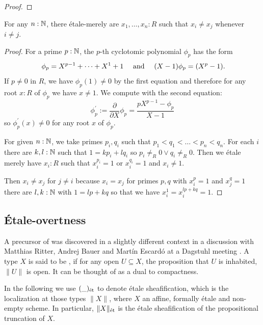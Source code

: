 \begin{proof}
\end{proof}

\begin{proposition}
  For any \(n:\N\), there étale-merely are \(x_1,\dots,x_n:R\) such that \(x_i\neq x_j\) whenever \(i\neq j\).
\end{proposition}

\begin{proof}
  For a prime \(p:\N\), the \(p\)-th cyclotomic polynomial \(\phi_p\) has the form
  \[
    \phi_p=X^{p-1}+\dots+X^1+1 \quad \text{ and } \quad (X-1)\phi_p=(X^p-1) \rlap{.}
  \]
  If \(p\neq 0\) in \(R\), we have \(\phi_p(1)\neq 0\) by the first equation
  and therefore for any root \(x:R\) of \(\phi_p\) we have \(x\neq 1\).
  We compute with the second equation:
  \[
    \phi_p^\prime:=\frac{\partial}{\partial X}\phi_p = \frac{pX^{p-1}-\phi_p}{X-1}
  \]
  so \(\phi_p^\prime(x)\neq 0\) for any root \(x\) of \(\phi_p\).

  For given \(n:\N\), we take primes \(p_i,q_i\) such that \(p_1<q_1<\dots <p_n < q_n\).
  For each \(i\) there are \(k,l:\N\) such that \(1=kp_i+lq_i\) so \(p_i\neq_R 0\vee q_i\neq_R 0\).
  Then we étale merely have \(x_i:R\) such that \(x_i^{p_i}=1\) or \(x_i^{q_i}=1\) and \(x_i\neq 1\).

  Then \(x_i\neq x_j\) for \(j\neq i\) because \(x_i=x_j\)
  for primes \(p,q\) with \(x_i^p=1\) and \(x_j^q=1\) there are \(l,k:\N\) with \(1=lp+kq\) so that we have \(x_i^1=x_i^{lp+kq}=1\).
\end{proof}

\subsection{Étale-overtness}

A precursor of  was discovered in a slightly different context in a discussion with Matthias Ritter, Andrej Bauer and Martín Escardó at a Dagstuhl meeting \cite{Dagstuhl-reference}.
A type \(X\) is said to be , if for any open \(U\subseteq X\), the proposition that \(U\) is inhabited, \(\|U\|\) is open. It can be thought of as a dual to compactness.

In the following we use \((\_)_{\et}\) to denote étale sheafification, which is the localization at those types $\|X\|$, where $X$ an affine, formally étale and non-empty scheme. In particular, $\|X\|_\et$ is the étale sheafification of the propositional truncation of $X$.

